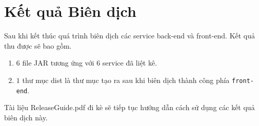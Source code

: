 \chapter{Kết quả Biên dịch}
\label{Chapter4}
Sau khi kết thúc quá trình biên dịch các service back-end và front-end. Kết quả thu được sẽ bao gồm.
\begin{enumerate}
    \item $6$ file JAR tương ứng với $6$ service đã liệt kê.
    \item $1$ thư mục dist là thư mục tạo ra sau khi biên dịch thành công phía \texttt{front-end}.
\end{enumerate}
Tài liệu ReleaseGuide.pdf đi kè sẽ tiếp tục hướng dẫn cách sử dụng các kết quả biên dịch này.


